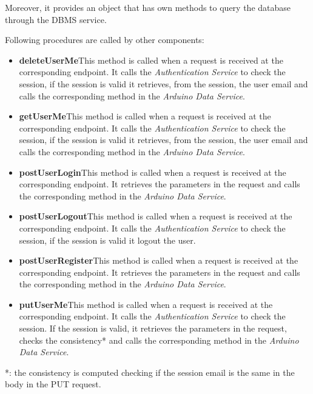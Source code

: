 Moreover, it provides an object that has own methods to query the database through the DBMS service.

Following procedures are called by other components:
\begin{itemize}
    \item \textbf{deleteUserMe}\quad This method is called when a request is received at the corresponding endpoint. It calls the \textit{Authentication Service} to check the session, if the session is valid it retrieves, from the session, the user email and calls the corresponding method in the \textit{Arduino Data Service}.
    \item \textbf{getUserMe}\quad This method is called when a request is received at the corresponding endpoint. It calls the \textit{Authentication Service} to check the session, if the session is valid it retrieves, from the session, the user email and calls the corresponding method in the \textit{Arduino Data Service}.
    \item \textbf{postUserLogin}\quad This method is called when a request is received at the corresponding endpoint. It retrieves the parameters in the request and calls the corresponding method in the \textit{Arduino Data Service}.
    \item \textbf{postUserLogout}\quad This method is called when a request is received at the corresponding endpoint. It calls the \textit{Authentication Service} to check the session, if the session is valid it logout the user.
    \item \textbf{postUserRegister}\quad This method is called when a request is received at the corresponding endpoint. It retrieves the parameters in the request and calls the corresponding method in the \textit{Arduino Data Service}.
    \item \textbf{putUserMe}\quad This method is called when a request is received at the corresponding endpoint. It calls the \textit{Authentication Service} to check the session. If the session is valid, it retrieves the parameters in the request, checks the consistency* and calls the corresponding method in the \textit{Arduino Data Service}.
\end{itemize}

*: the consistency is computed checking if the session email is the same in the body in the PUT request.

